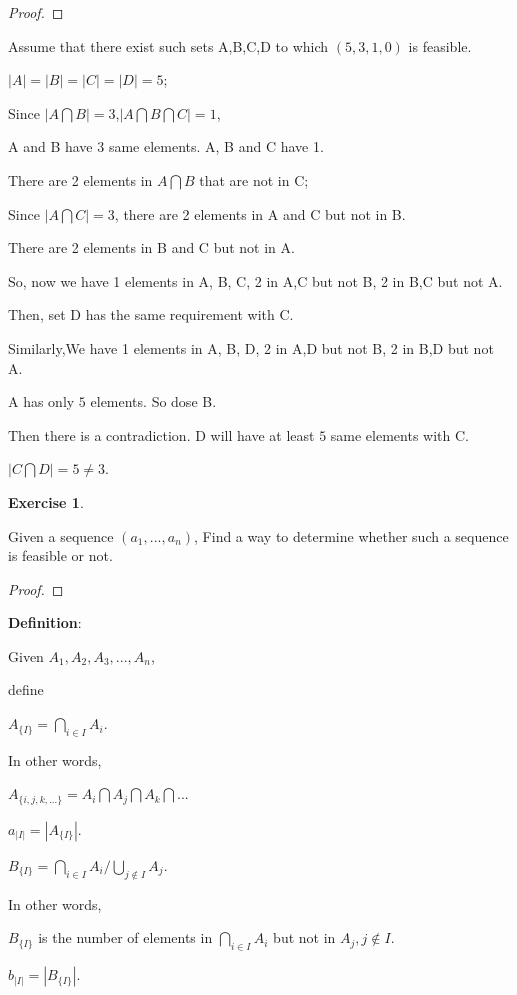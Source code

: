 \documentclass[12pt,a4]{article}
\theoremstyle{exercise}
\newtheorem{exercise}[theorem]{Exercise}
\begin{document}
\begin{proof}
\end{proof}

Assume that there exist such sets A,B,C,D to which $(5,3,1,0)$ is feasible.

$|A|=|B|=|C|=|D|=5$;

Since $|A\bigcap B|=3$,$|A\bigcap B\bigcap C|=1$,

A and B have 3 same elements. A, B and C have 1.

There are 2 elements in $A\bigcap B$ that are not in C;

Since $|A\bigcap C|=3$, there are 2 elements in A and C but not in B.

There are 2 elements in B and C but not in A.

So, now we have 1 elements in A, B, C, 2 in A,C but not B, 2 in B,C but not A.

Then, set D has the same requirement with C.

Similarly,We have 1 elements in A, B, D, 2 in A,D but not B, 2 in B,D but not A.

A has only $5$ elements. So dose B.

Then there is a contradiction. D will have at least $5$ same elements with C.

$|C\bigcap D|=5\not = 3$.

\begin{exercise}
\end{exercise}
	Given a sequence $(a_1,...,a_n)$, Find a way to determine whether such a sequence is feasible or not.

\begin{proof}
\end{proof}

 \textbf{Definition}: 
 
     Given $A_1,A_2,A_3,...,A_n$, 
     
     define 
     \begin{center}
      $A_{\{I\}}=\bigcap \limits_{i \in I} A_i $. 
     \end{center} 
     In other words, 
     \begin{center}
      $A_{\{i,j,k,...\}}= A_i \bigcap A_j \bigcap A_k \bigcap ...$
      
      $a_{|I|}=|A_{\{I\}}|.$
     
      $B_{\{I\}}=\bigcap \limits_{i \in I} A_i / \bigcup \limits_{j\notin I }{A_j}$.
     \end{center}
     
     In other words,
     \begin{center}
      $B_{\{I\}}$ is the number of elements in $\bigcap \limits_{i \in I} A_i$ but not in $A_j,j\notin I$.
     
      $b_{|I|}=|B_{\{I\}}|.$
     \end{center}
     
\end{document}
